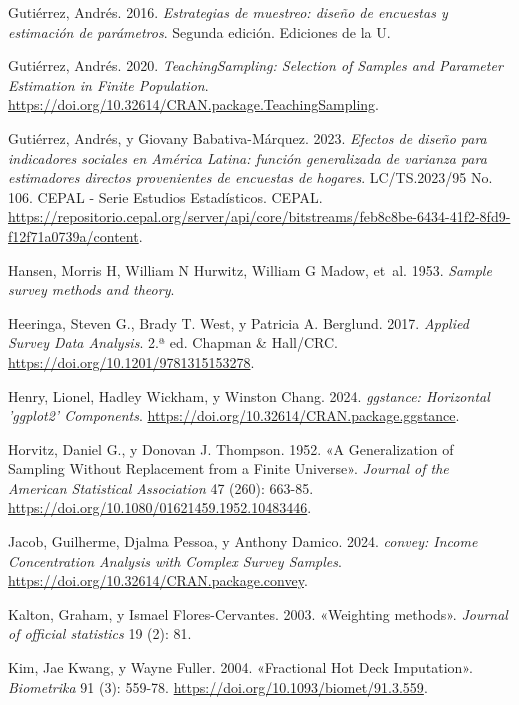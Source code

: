 \documentclass[
  spanish,
  11pt,
  letterpaper,
  oneside,
  open=any]{scrbook}
\newlength{\cslhangindent}
\newenvironment{CSLReferences}[2] %
 {\begin{list}{}{%
  \setlength{\itemindent}{0pt}
  \setlength{\leftmargin}{0pt}
  \setlength{\parsep}{0pt}
  \ifodd #1
   \setlength{\leftmargin}{\cslhangindent}
   \setlength{\itemindent}{-1\cslhangindent}
  \fi
  \setlength{\itemsep}{#2\baselineskip}}}
 {\end{list}}
\begin{document}
\begin{CSLReferences}{1}{1}
Gutiérrez, Andrés. 2016. \emph{Estrategias de muestreo: diseño de
encuestas y estimación de parámetros}. Segunda edición. Ediciones de la
U.

Gutiérrez, Andrés. 2020. \emph{TeachingSampling: Selection of Samples
and Parameter Estimation in Finite Population}.
\url{https://doi.org/10.32614/CRAN.package.TeachingSampling}.

Gutiérrez, Andrés, y Giovany Babativa-Márquez. 2023. \emph{Efectos de
diseño para indicadores sociales en Am{é}rica Latina: función
generalizada de varianza para estimadores directos provenientes de
encuestas de hogares}. LC/TS.2023/95 No. 106. CEPAL - Serie Estudios
Estadísticos. CEPAL.
\url{https://repositorio.cepal.org/server/api/core/bitstreams/feb8c8be-6434-41f2-8fd9-f12f71a0739a/content}.

{Hansen, Morris H, William N Hurwitz, William G Madow, et~al.} 1953.
\emph{Sample survey methods and theory}.

Heeringa, Steven G., Brady T. West, y Patricia A. Berglund. 2017.
\emph{Applied Survey Data Analysis}. 2.ª ed. Chapman \& Hall/CRC.
\url{https://doi.org/10.1201/9781315153278}.

Henry, Lionel, Hadley Wickham, y Winston Chang. 2024. \emph{ggstance:
Horizontal 'ggplot2' Components}.
\url{https://doi.org/10.32614/CRAN.package.ggstance}.

Horvitz, Daniel G., y Donovan J. Thompson. 1952. {«A Generalization of
Sampling Without Replacement from a Finite Universe»}. \emph{Journal of
the American Statistical Association} 47 (260): 663-85.
\url{https://doi.org/10.1080/01621459.1952.10483446}.

Jacob, Guilherme, Djalma Pessoa, y Anthony Damico. 2024. \emph{convey:
Income Concentration Analysis with Complex Survey Samples}.
\url{https://doi.org/10.32614/CRAN.package.convey}.

Kalton, Graham, y Ismael Flores-Cervantes. 2003. {«Weighting methods»}.
\emph{Journal of official statistics} 19 (2): 81.

Kim, Jae Kwang, y Wayne Fuller. 2004. {«Fractional Hot Deck
Imputation»}. \emph{Biometrika} 91 (3): 559-78.
\url{https://doi.org/10.1093/biomet/91.3.559}.


\end{CSLReferences}
\end{document}
